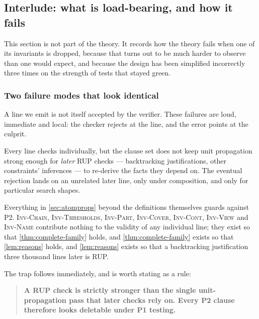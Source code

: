 \documentclass[11pt,a4paper]{article}
\theoremstyle{plain}
\theoremstyle{definition}
\theoremstyle{remark}
\newcommand{\inv}[1]{\textnormal{\textsc{Inv-#1}}}
\newcommand{\invChain}{\inv{Chain}}
\newcommand{\invThresholds}{\inv{Thresholds}}
\newcommand{\invPart}{\inv{Part}}
\newcommand{\invCover}{\inv{Cover}}
\newcommand{\invCont}{\inv{Cont}}
\newcommand{\invView}{\inv{View}}
\newcommand{\invName}{\inv{Name}}
\begin{document}
\subsection*{Interlude: what is load-bearing, and how it fails}
\label{sec:loadbearing}

This section is not part of the theory.  It records how the theory fails when
one of its invariants is dropped, because that turns out to be much harder to
observe than one would expect, and because the design has been simplified
incorrectly three times on the strength of tests that stayed green.

\subsubsection*{Two failure modes that look identical}
\label{sec:p1p2}

\begin{description}[font=\normalfont\bfseries,leftmargin=2.4em]
  \item[P1.] A line we emit is not itself accepted by the verifier.  These
    failures are loud, immediate and local: the checker rejects at the line, and
    the error points at the culprit.
  \item[P2.] Every line checks individually, but the clause set does not keep
    unit propagation strong enough for \emph{later} RUP checks --- backtracking
    justifications, other constraints' inferences --- to re-derive the facts they
    depend on.  The eventual rejection lands on an unrelated later line, only
    under composition, and only for particular search shapes.
\end{description}

Everything in \cref{sec:atomprops} beyond the definitions themselves guards
against P2.  \invChain{}, \invThresholds{}, \invPart{}, \invCover{}, \invCont{},
\invView{} and \invName{} contribute nothing to the validity of any individual
line; they exist so that \cref{thm:complete-family} holds, and
\cref{thm:complete-family} exists so that \cref{lem:reasons} holds, and
\cref{lem:reasons} exists so that a backtracking justification three thousand
lines later is RUP.

The trap follows immediately, and is worth stating as a rule:

\begin{quote}
  \textbf{A RUP check is strictly stronger than the single unit-propagation pass
  that later checks rely on.  Every P2 clause therefore looks deletable under
  P1 testing.}
\end{quote}
\end{document}

